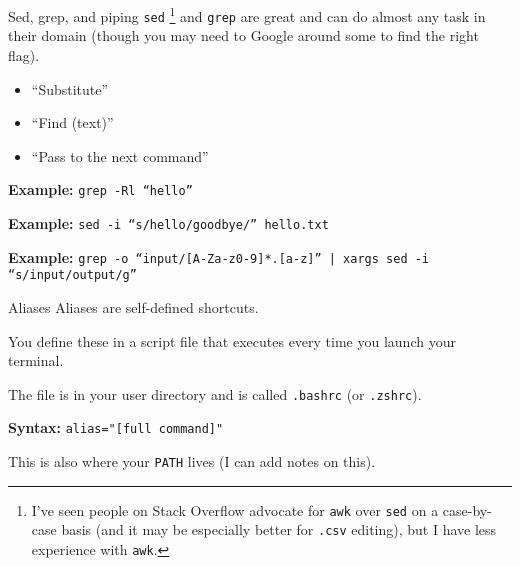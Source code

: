 \begin{frame}{Sed, grep, and piping}
    \texttt{sed}
    \footnote{I've seen people on Stack Overflow advocate for \texttt{awk} over \texttt{sed}
    on a case-by-case basis
    (and it may be especially better for \texttt{.csv} editing),
    but I have less experience with \texttt{awk}.}
    and \texttt{grep} are great and can do almost any task in their domain
    (though you may need to Google around some to find the right flag).


    \begin{itemize}
        \item[\texttt{sed}:] ``Substitute''
        \item[\texttt{grep}:] ``Find (text)''
        \item[\texttt{|}:] ``Pass to the next command''
    \end{itemize}

    \textbf{Example:} \texttt{grep -Rl ``hello''}

    \textbf{Example:} \texttt{sed -i ``s/hello/goodbye/'' hello.txt}

    \textbf{Example:} \scriptsize \texttt{grep -o ``input/[A-Za-z0-9]*.[a-z]'' | xargs sed -i ``s/input/output/g''}

\end{frame}

\begin{frame}{Aliases}
    \stretchon
    Aliases are self-defined shortcuts.

    You define these in a script file that executes every time you launch
    your terminal.

    The file is in your user directory and is called \texttt{.bashrc} (or \texttt{.zshrc}).

    \textbf{Syntax:} \texttt{alias="[full command]"}


    This is also where your \texttt{PATH} lives (I can add notes on this).
\end{frame}
